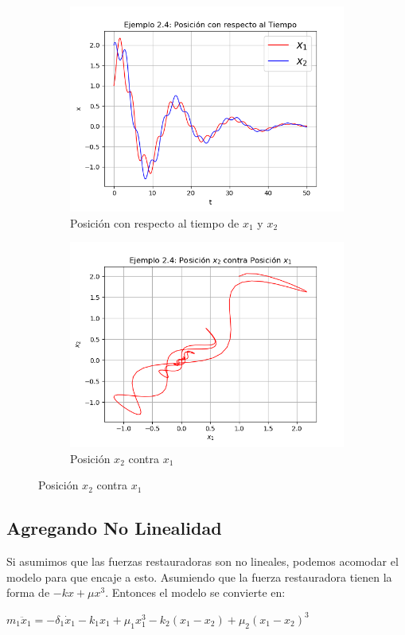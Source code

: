 \documentclass[a4paper]{article}
\begin{document}
\begin{center}
\begin{figure}[ht!]
\begin{subfigure}{0.6\textwidth}
  \includegraphics[width=\linewidth]{ejemplo_2_4_1.png}
  \caption{Posición con respecto al tiempo de $x_1$ y $x_2$}
\end{subfigure}
\begin{subfigure}{0.6\textwidth}
  \centering
  \includegraphics[width=\linewidth]{ejemplo_2_4_4.png}
  \caption{Posición $x_2$ contra $x_1$}
\end{subfigure}
\end{figure}

\subsection{Agregando No Linealidad}
Si asumimos que las fuerzas restauradoras son no lineales, podemos acomodar el modelo para que encaje a esto. Asumiendo que la fuerza restauradora tienen la forma de $-kx + \mu x^3$. Entonces el modelo se convierte en:
\begin{center}
$m_1\ddot x_1 = - \delta_1\dot x_1 - k_1x_1 + \mu_1x_1^3 - k_2(x_1 - x_2) + \mu_2(x_1 - x_2)^3$


\end{center}
\end{center}
\end{document}
